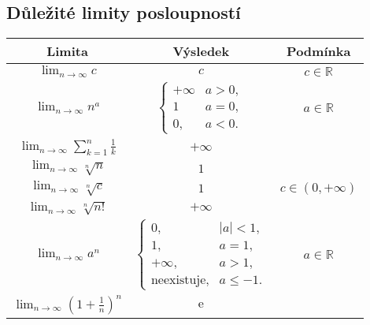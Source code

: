 \noindent\begin{minipage}{\linewidth}
    \subsection*{Důležité limity posloupností }

    \centering
    \begin{tabular}{|c|c|c|}
        \hline
        \textbf{Limita}                                                  & \textbf{Výsledek}                                                             & \textbf{Podmínka}    \\
        \hline
        $\displaystyle\lim_{n\to\infty} c$                               & $c$                                                                           & $c \in \mathbb{R}$   \\
        $\displaystyle\lim_{n\to\infty} n^a$                             & $\begin{cases} +\infty & a > 0, \\ 1 & a = 0, \\ 0, & a < 0. \end{cases}$ & $a \in \mathbb{R}$   \\
        $\displaystyle\lim_{n\to\infty} \sum_{k=1}^n \frac{1}{k}$        & $+\infty$                                                                     &                      \\
        $\displaystyle\lim_{n\to\infty} \sqrt[n]{n}$                     & $1$                                                                           &                      \\
        $\displaystyle\lim_{n\to\infty} \sqrt[n]{c}$                     & $1$                                                                           & $c \in (0, +\infty)$ \\
        $\displaystyle\lim_{n\to\infty} \sqrt[n]{n!}$                    & $+\infty$                                                                     &                      \\
        $\displaystyle\lim_{n\to\infty} a^n$                             & $\begin{cases} 0, & |a| < 1, \\ 1, & a = 1, \\ +\infty, & a > 1, \\ \text{neexistuje}, & a \leq -1. \end{cases}$   & $a\in\mathbb{R}$     \\
        $\displaystyle\lim_{n\to\infty} \left(1 + \frac{1}{n} \right)^n$ & $\mathrm{e}$                                                                  &                      \\
        \hline
    \end{tabular}

\end{minipage}

